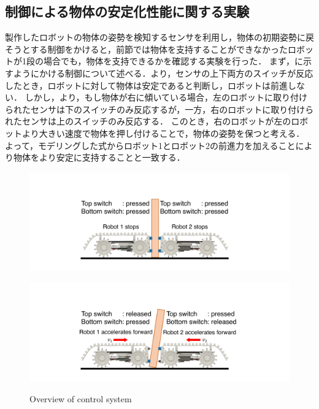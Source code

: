\subsection{制御による物体の安定化性能に関する実験}
製作したロボットの物体の姿勢を検知するセンサを利用し，物体の初期姿勢に戻そうとする制御をかけると，前節では物体を支持することができなかったロボットが1段の場合でも，物体を支持できるかを確認する実験を行った．
まず，に示すようにかける制御について述べる．より，センサの上下両方のスイッチが反応したとき，ロボットに対して物体は安定であると判断し，ロボットは前進しない．
しかし，より，もし物体が右に傾いている場合，左のロボットに取り付けられたセンサは下のスイッチのみ反応するが，一方，右のロボットに取り付けられたセンサは上のスイッチのみ反応する．
このとき，右のロボットが左のロボットより大きい速度で物体を押し付けることで，物体の姿勢を保つと考える．
よって，モデリングした式からロボット1とロボット2の前進力を加えることにより物体をより安定に支持することと一致する．
\begin{figure}[tb]
  \begin{minipage}[b]{0.485\columnwidth}
  \centering
  \includegraphics[width=\columnwidth]{figures/control-upright-v3.pdf}
  \label{fig:upright}
 \end{minipage}%
 \begin{minipage}[b]{0.51\columnwidth}
  \centering
  \includegraphics[width=\columnwidth]{figures/control-tilted-v3.pdf}
  \label{fig:tilted}
 \end{minipage}
 \caption{Overview of control system}
 \label{fig:control-figure}
\end{figure}
